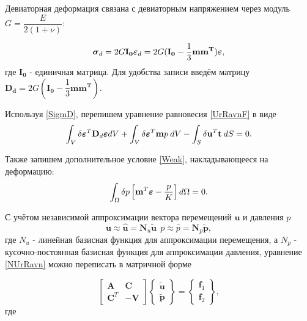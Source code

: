 \documentclass[a4paper,14pt]{extarticle}
\begin{document}
Девиаторная деформация связана с девиаторным напряжением через модуль  $G=\dfrac{E}{2(1+\nu)}$:

\begin{equation}\label{SigmD}
\mbox{\boldmath$\sigma$}_d=2G\mathbf{I_0}\mbox{\boldmath$\varepsilon$}_d=2G(\mathbf{I_0}-\dfrac{1}{3}\mathbf{mm^T})\mbox{\boldmath$\varepsilon$},
\end{equation}
где $\mathbf{I_0}$ - единичная матрица. Для удобства записи введём матрицу $\mathbf{D_d}=2G(\mathbf{I_0}-\dfrac{1}{3}\mathbf{mm^T})$.

Используя \eqref{SigmD}, перепишем уравнение равновесия \eqref{UrRavnF} в виде
\begin{equation}\label{NUrRavn}
\int_{V} {\delta \mbox{\boldmath$\varepsilon$}^{T} \mathbf{D}_{d} \mbox{\boldmath$\varepsilon$} dV}+\int_{V} {\delta \mbox{\boldmath$\varepsilon$}^{T} \mathbf{m} p \: dV}-\int_{S} {\delta \mathbf{u}^{T} \mathbf{t} \: dS}=0.
\end{equation}

Также запишем дополнительное условие \eqref{Weak}, накладывающееся на деформацию:
\begin{equation}
\int_{\Omega} {\delta p \left[ \mathbf{m}^{T} \mbox{\boldmath$\varepsilon$}-\dfrac{p}{K}\right] d\Omega}=0.
\end{equation}

С учётом независимой аппроксимации вектора перемещений $\mathbf{u}$ и давления $p$ 
\begin{equation}
\mathbf{u}\approx \hat{\mathbf{u}}=\mathbf{N}_{u} \tilde{\mathbf{u}} \  \  p\approx \hat{p}=\mathbf{N}_{p} \tilde{\mathbf{p}}, 
\end{equation}
где $N_u$ - линейная базисная функция для аппроксимации перемещения, а $N_p$ - кусочно-постоянная базисная функция для аппроксимации давления, уравнение \eqref{NUrRavn} можно переписать в матричной форме

\begin{equation}\label{SLAUMixed}
\begin{bmatrix}
\mathbf{A} & \mathbf{C} \\
\mathbf{C}^{T} & -\mathbf{V} 
\end{bmatrix}
\begin{Bmatrix}
\tilde{\mathbf{u}} \\
\tilde{\mathbf{p}} 
\end{Bmatrix}
=
\begin{Bmatrix}
\mathbf{f}_1 \\
\mathbf{f}_2
\end{Bmatrix},
\end{equation}
где
\end{document}
